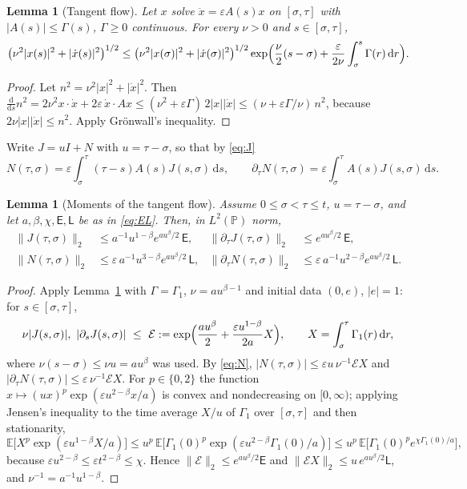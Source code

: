 \documentclass[11pt]{article}
\newcommand{\dd}{\mathrm{d}}
\newcommand{\E}{\mathbb{E}}
\newcommand{\PP}{\mathbb{P}}
\newcommand{\eps}{\varepsilon}
\newcommand{\cE}{\mathcal{E}}
\newcommand{\sE}{\mathsf{E}}
\newcommand{\sL}{\mathsf{L}}
\newcommand{\nrm}[2]{\|#1\|_{#2}}
\newtheorem{lemma}[theorem]{Lemma}
\theoremstyle{remark}
\begin{document}
\begin{lemma}[Tangent flow]\label{lem:tangent}
Let $x$ solve $\ddot x = \eps A(s)x$ on $[\sigma,\tau]$ with
$|A(s)|\le\Gamma(s)$, $\Gamma\ge0$ continuous. For every $\nu>0$ and
$s\in[\sigma,\tau]$,
\[
  \bigl(\nu^2|x(s)|^2+|\dot x(s)|^2\bigr)^{1/2}
  \le\bigl(\nu^2|x(\sigma)|^2+|\dot x(\sigma)|^2\bigr)^{1/2}
  \exp\Bigl(\frac\nu2(s-\sigma)+\frac{\eps}{2\nu}\int_\sigma^s\Gamma(r)\,\dd r\Bigr).
\]
\end{lemma}

\begin{proof}
Let $n^2 = \nu^2|x|^2+|\dot x|^2$. Then
$\frac{\dd}{\dd s}n^2 = 2\nu^2x\cdot\dot x+2\eps\,\dot x\cdot Ax
\le(\nu^2+\eps\Gamma)\,2|x||\dot x|\le(\nu+\eps\Gamma/\nu)\,n^2$, because
$2\nu|x||\dot x|\le n^2$. Apply Gr\"onwall's inequality.
\end{proof}

Write $J = uI + N$ with $u = \tau-\sigma$, so that by \eqref{eq:J}
\begin{equation}
  N(\tau,\sigma) = \eps\int_\sigma^\tau(\tau-s)A(s)J(s,\sigma)\,\dd s,
  \qquad
  \partial_\tau N(\tau,\sigma) = \eps\int_\sigma^\tau A(s)J(s,\sigma)\,\dd s .
  \label{eq:N}
\end{equation}

\begin{lemma}[Moments of the tangent flow]\label{lem:Jmom}
Assume $0\le\sigma<\tau\le t$, $u = \tau-\sigma$, and let $a,\beta,\chi,\sE,\sL$
be as in \eqref{eq:EL}. Then, in $L^2(\PP)$ norm,
\begin{align*}
  \nrm{J(\tau,\sigma)}{2} &\le a^{-1}u^{1-\beta}e^{au^\beta/2}\,\sE, &
  \nrm{\partial_\tau J(\tau,\sigma)}{2} &\le e^{au^\beta/2}\,\sE,\\
  \nrm{N(\tau,\sigma)}{2} &\le\eps\,a^{-1}u^{3-\beta}e^{au^\beta/2}\,\sL, &
  \nrm{\partial_\tau N(\tau,\sigma)}{2} &\le\eps\,a^{-1}u^{2-\beta}e^{au^\beta/2}\,\sL .
\end{align*}
\end{lemma}

\begin{proof}
Apply Lemma~\ref{lem:tangent} with $\Gamma=\Gamma_1$,
$\nu = a u^{\beta-1}$ and initial data $(0,e)$, $|e|=1$: for
$s\in[\sigma,\tau]$,
\[
  \nu|J(s,\sigma)|,\ |\partial_sJ(s,\sigma)|\ \le\ \cE
  := \exp\Bigl(\frac{a u^\beta}{2}+\frac{\eps u^{1-\beta}}{2a}X\Bigr),
  \qquad X = \int_\sigma^\tau\Gamma_1(r)\,\dd r ,
\]
where $\nu(s-\sigma)\le\nu u = au^\beta$ was used. By \eqref{eq:N},
$|N(\tau,\sigma)|\le\eps u\,\nu^{-1}\cE X$ and
$|\partial_\tau N(\tau,\sigma)|\le\eps\,\nu^{-1}\cE X$. For $p\in\{0,2\}$ the
function $x\mapsto(ux)^p\exp(\eps u^{2-\beta}x/a)$ is convex and
nondecreasing on $[0,\infty)$; applying Jensen's inequality to the time
average $X/u$ of $\Gamma_1$ over $[\sigma,\tau]$ and then stationarity,
\[
  \E\bigl[X^p\exp(\eps u^{1-\beta}X/a)\bigr]
  \le u^p\,\E\bigl[\Gamma_1(0)^p\exp(\eps u^{2-\beta}\Gamma_1(0)/a)\bigr]
  \le u^p\,\E\bigl[\Gamma_1(0)^pe^{\chi\Gamma_1(0)/a}\bigr],
\]
because $\eps u^{2-\beta}\le\eps t^{2-\beta}\le\chi$. Hence
$\nrm{\cE}{2}\le e^{au^\beta/2}\sE$ and $\nrm{\cE X}{2}\le u\,e^{au^\beta/2}\sL$,
and $\nu^{-1} = a^{-1}u^{1-\beta}$.
\end{proof}
\end{document}

